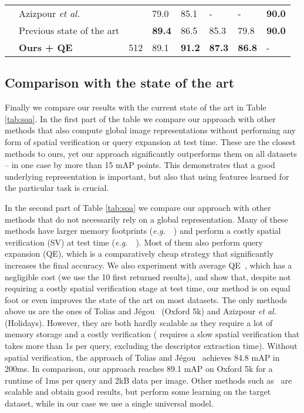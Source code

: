 \documentclass[runningheads]{llncs}
\def\etal{\emph{et al.}~}
\def\eg{\emph{e.g.}~}
\begin{document}
\begin{table}[t!]
\begin{tabularx}{\textwidth}{@{}p{0.5cm}p{3.5cm}p{1cm}YYYYY@{}}
 &{\scriptsize Azizpour \etal \cite{Azizpour2015}} &  & 79.0 & 85.1 & -  & -  & \textbf{90.0} \\
 & Previous state of the art & & \textbf{89.4} \cite{Tolias2015b} & 86.5 \cite{Tolias2016} & 85.3 \cite{Tolias2015} & 79.8 \cite{Tolias2016} & \textbf{90.0} \cite{Azizpour2015}\\
 &\textbf{Ours + QE} & {\scriptsize 512} & 89.1 & \textbf{91.2} & \textbf{87.3} & \textbf{86.8} & - \\ 
 \bottomrule
 \end{tabularx}
 \end{table}

 \subsection{Comparison with the state of the art}
 \label{sec:exp-final}
 Finally we compare our results with the current state of the art in Table \ref{tab:soa}. 
 In the first part of the table we compare our approach with other methods that also compute global image representations without performing any form of spatial verification or query expansion at test time.
 These are the closest methods to ours, yet our approach significantly outperforms them on all datasets -- in
one case by more than 15 mAP points. This demonstrates that a good underlying representation is important, but also that using features learned for the particular task is crucial.

 In the second part of Table \ref{tab:soa} we compare our approach with other methods that do not necessarily rely on a
 global representation. Many of these methods have larger memory footprints (\eg~\cite{Tolias2015b,Tolias2016,Danfeng2011,Azizpour2015}) and perform a costly spatial verification
 (SV) at test time (\eg~\cite{Tolias2016,Xinchao2015,Mikulik2013}). Most of them also perform query expansion (QE), which is a comparatively cheap strategy that
 significantly increases the final accuracy. We also experiment with average QE~\cite{Chum2007},
 which has a negligible cost (we use the 10 first returned results),
 and show that, despite not requiring a costly spatial verification stage at test time, our method is on
 equal foot or even improves the state of the art on most datasets. 
 The only methods above us are the ones of Tolias and J\'egou~\cite{Tolias2015b} (Oxford 5k) and Azizpour \etal~\cite{Azizpour2015} (Holidays). However, they are both hardly scalable as they require a lot of memory storage and a costly verification (\cite{Tolias2015b} requires a slow spatial verification that takes more than 1s per query, excluding the descriptor extraction time). Without spatial verification, the approach of Tolias and J\'egou~\cite{Tolias2015b} achieves 84.8 mAP in 200ms. In comparison, our approach reaches 89.1 mAP on Oxford 5k for a runtime of 1ms per query and 2kB data per image.
 Other methods such as~\cite{Danfeng2011,Shen2014,Tolias2015} are scalable and obtain good results, but perform some learning on the target dataset, while in our case we use a single universal model.
\end{document}
